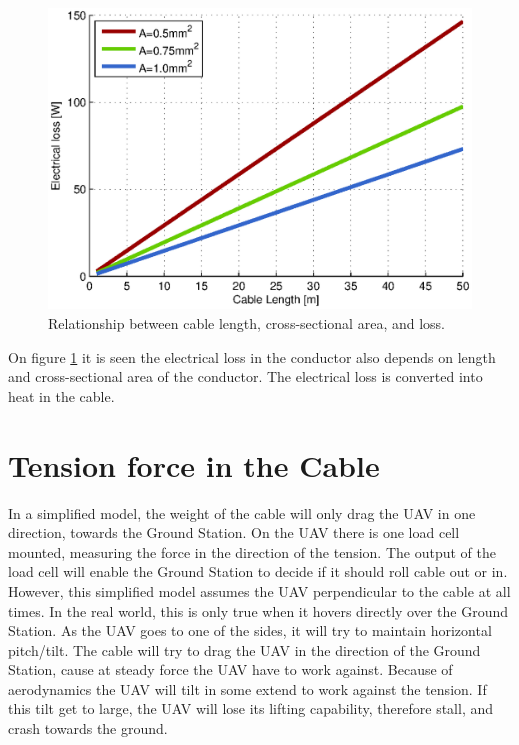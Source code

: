 \begin{figure}[hbtp]
\centering
\includegraphics[scale=1]{graphics/matlab/cable_relation_lenght_loss_crosssection.eps}
\caption[Relationship between cable length, cross-sectional area and cable loss.]{Relationship between cable length, cross-sectional area, and  loss.}
\label{fig:relationship_loss_length}
\end{figure}


\noindent
On figure \ref{fig:relationship_loss_length} it is seen the electrical loss in the conductor also depends on length and cross-sectional area of the conductor. The electrical loss is converted into heat in the cable.

\newpage
\section{Tension force in the Cable}

\noindent
In a simplified model, the weight of the cable will only drag the UAV in one direction, towards the Ground Station. On the UAV there is one load cell mounted, measuring the force in the direction of the tension. The output of the load cell will enable the Ground Station to decide if it should roll cable out or in. However, this simplified model assumes the UAV perpendicular to the cable at all times. 
In the real world, this is only true when it hovers directly over the Ground Station. As the UAV goes to one of the sides, it will try to maintain horizontal pitch/tilt. The cable will try to drag the UAV in the direction of the Ground Station, cause at steady force the UAV have to work against. Because of aerodynamics the UAV will tilt in some extend to work against the tension. If this tilt get to large, the UAV will lose its lifting capability, therefore stall, and crash towards the ground.


